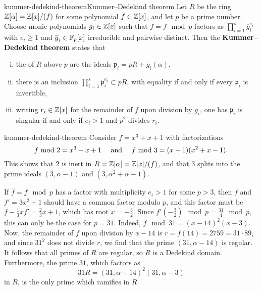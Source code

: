 \begin{topic}{kummer-dedekind-theorem}{Kummer--Dedekind theorem}
    Let $R$ be the ring $\ZZ[\alpha] = \ZZ[x] / (f)$ for some   polynomial $f \in \ZZ[x]$, and let $p$ be a prime number. Choose monic polynomials $g_i \in \ZZ[x]$ such that $\overline{f} = f \mod p$ factors as $\prod_{i = 1}^{s} \overline{g}_i^{e_i}$ with $e_i \ge 1$ and $\overline{g}_i \in \FF_p[x]$ irreducible and pairwise distinct. Then the \textbf{Kummer--Dedekind theorem} states that
    \begin{enumerate}[(i)]
        \item the  of $R$ above $p$ are the ideals $\mathfrak{p}_i = pR + g_i(\alpha)$,
        \item there is an inclusion $\prod_{i = 1}^{s} \mathfrak{p}_i^{e_i} \subset pR$, with equality if and only if every $\mathfrak{p}_i$ is invertible,
        \item writing $r_i \in \ZZ[x]$ for the remainder of $f$ upon division by $g_i$, one has $\mathfrak{p}_i$ is singular if and only if $e_i > 1$ and $p^2$ divides $r_i$.
    \end{enumerate}
\end{topic}

\begin{example}{kummer-dedekind-theorem}
    Consider $f = x^3 + x + 1$ with factorizations
    \[ f \mod 2 = x^3 + x + 1 \quad \textup{ and } \quad f \mod 3 = (x - 1)(x^2 + x - 1) . \]
    This shows that $2$ is inert in $R = \ZZ[\alpha] = \ZZ[x] / (f)$, and that $3$ splits into the prime ideals $(3, \alpha - 1)$ and $(3, \alpha^2 + \alpha - 1)$.
    
    If $\overline{f} = f \mod p$ has a factor with multiplicity $e_i > 1$ for some $p > 3$, then $f$ and $f' = 3x^2 + 1$ should have a common factor modulo $p$, and this factor must be $f - \tfrac{1}{3} x f' = \tfrac{2}{3} x + 1$, which has root $x = - \tfrac{3}{2}$. Since $f'(-\tfrac{3}{2}) \mod p = \tfrac{31}{4} \mod p$, this can only be the case for $p = 31$. Indeed, $f \mod 31 = (x - 14)^2 (x - 3)$. Now, the remainder of $f$ upon division by $x - 14$ is $r = f(14) = 2759 = 31 \cdot 89$, and since $31^2$ does not divide $r$, we find that the prime $(31, \alpha - 14)$ is regular. It follows that all primes of $R$ are regular, so $R$ is a Dedekind domain. Furthermore, the prime $31$, which factors as
    \[ 31 R = (31, \alpha - 14)^2 (31, \alpha - 3) \]
    in $R$, is the only prime which ramifies in $R$.
\end{example}

